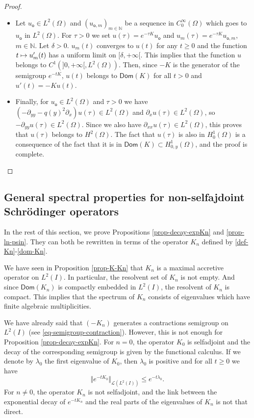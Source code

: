 \documentclass[11pt]{article}
\newcommand{\Subsection}{\subsection}
\numberwithin{equation}{section}
\let\mathcal\mathscr
\def\mto{\mathchoice{\longmapsto}{\mapsto}{\mapsto}{\mapsto}}
\theoremstyle{plain}
\theoremstyle{definition}
\newcommand{\nr}[1]{\Vert #1\Vert}
\newcommand{\1}{\mathds 1}
\newcommand{\Dom}{\mathsf{Dom}}
\newcommand{\N}{\mathbb{N}}
\let\d\delta
\let\l\lambda
\let\O\Omega
\newcommand{\Lc}{{\mathcal L}}
\newcommand{\uo}{u_{\mathsf{o}}}
\newcommand{\uom}{u_{\mathsf{o},m}}
\begin{document}
\begin{proof}
\begin{itemize}
\item
Let $\uo \in L^2(\O)$ and $(\uom)_{m \in \N}$ be a sequence in $C_0^\infty(\O)$ which goes to $\uo$ in $L^2(\O)$. For $\tau > 0$ we set $u(\tau) = e^{-\tau K} \uo$ and $u_m(\tau) = e^{-\tau K} \uom$, $m \in \N$. Let $\d > 0$. $u_m(t)$ converges to $u(t)$ for any $t \geq 0$ and the function $t \mto u_m'(t)$ has a uniform limit on $[\d,+\infty[$. This implies that the function $u$ belongs to $C^1(]0,+\infty[,L^2(\O))$. Then, since $-K$ is the generator of the semigroup $e^{-tK}$, $u(t)$ belongs to $\Dom(K)$ for all $t > 0$ and $u'(t) = -K u(t)$.

\item
Finally, for $\uo \in L^2(\O)$ and $\tau > 0$ we have $(-\partial_{yy} - q(y)^2 \partial_x) u(\tau) \in L^2(\O)$ and $\partial_x u(\tau) \in L^2(\O)$, so $-\partial_{yy}u(\tau) \in L^2(\O)$. Since we also have $\partial_{xx}u(\tau) \in L^2(\O)$, this proves that $u(\tau)$ belongs to $H^2(\O)$. The fact that $u(\tau)$ is also in $H_0^1(\O)$ is a consequence of the fact that it is in $\Dom(K) \subset H^1_{0,y}(\O)$, and the proof is complete.\qedhere
\end{itemize}
\end{proof}

\Subsection{General spectral properties for non-selfajdoint Schrödinger operators}

In the rest of this section, we prove Propositions \ref{prop-decay-expKn} and \ref{prop-ln-psin}. They can both be rewritten in terms of the operator $K_n$ defined by \eqref{def-Kn}-\eqref{dom-Kn}.

We have seen in Proposition \ref{prop-K-Kn} that $K_n$ is a maximal accretive operator on $L^2(I)$. In particular, the resolvent set of $K_n$ is not empty. And since $\Dom(K_n)$ is compactly embedded in $L^2(I)$, the resolvent of $K_n$ is compact. This implies that the spectrum of $K_n$ consists of eigenvalues which have finite algebraic multiplicities.

We have already said that $(-K_n)$ generates a contractions semigroup on $L^2(I)$ (see \eqref{eq-semigroup-contraction}). However, this is not enough for Proposition \ref{prop-decay-expKn}. For $n = 0$, the operator $K_0$ is selfadjoint and the decay of the corresponding semigroup is given by the functional calculus. If we denote by $\l_0$ the first eigenvalue of $K_0$, then $\l_0$ is positive and for all $t \geq 0$ we have
\[
\nr{e^{-t K_0}}_{\Lc(L^2(I))} \leq e^{-t\l_0}.
\]
For $n \neq 0$, the operator $K_n$ is not selfadjoint, and the link between the exponential decay of $e^{-tK_n}$ and the real parts of the eigenvalues of $K_n$ is not that direct.
\end{document}
